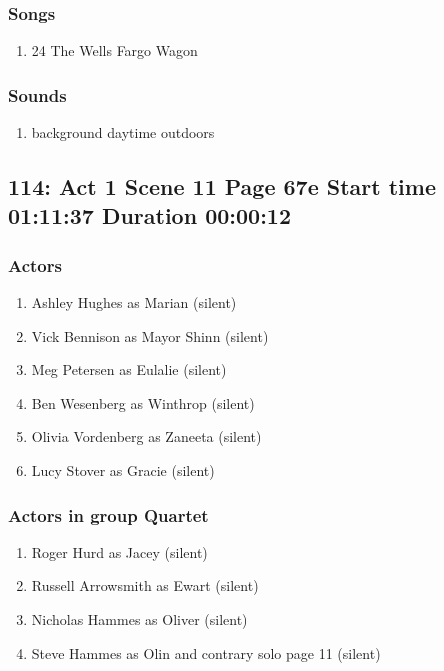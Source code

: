 \subsubsection{Songs}
\begin{enumerate}
\item 24 The Wells Fargo Wagon
\end{enumerate}\subsubsection{Sounds}
\begin{enumerate}
\item background daytime outdoors
\end{enumerate}
\subsection{114: Act 1 Scene 11 Page 67e Start time 01:11:37 Duration 00:00:12}

\subsubsection{Actors}
\begin{enumerate}
\item Ashley Hughes as Marian (silent)
\item Vick Bennison as Mayor Shinn (silent)
\item Meg Petersen as Eulalie (silent)
\item Ben Wesenberg as Winthrop (silent)
\item Olivia Vordenberg as Zaneeta (silent)
\item Lucy Stover as Gracie (silent)
\end{enumerate}
\subsubsection{Actors in group Quartet}
\begin{enumerate}
\item Roger Hurd as Jacey (silent)
\item Russell Arrowsmith as Ewart (silent)
\item Nicholas Hammes as Oliver (silent)
\item Steve Hammes as Olin and contrary solo page 11 (silent)
\end{enumerate}
